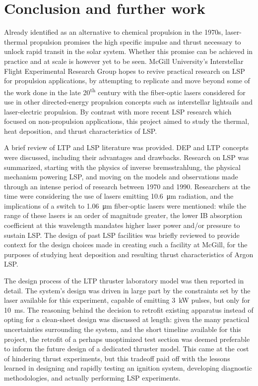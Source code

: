 \chapter{Conclusion and further work}
    Already identified as an alternative to chemical propulsion in the 1970s, laser-thermal propulsion promises the high specific impulse and thrust necessary to unlock rapid transit in the solar system. Whether this promise can be achieved in practice and at scale is however yet to be seen. McGill University's Interstellar Flight Experimental Research Group hopes to revive practical research on LSP for propulsion applications, by attempting to replicate and move beyond some of the work done in the late 20\textsuperscript{th} century with the fiber-optic lasers considered for use in other directed-energy propulsion concepts such as interstellar lightsails and laser-electric propulsion. By contrast with more recent LSP research which focused on non-propulsion applications, this project aimed to study the thermal, heat deposition, and thrust characteristics of LSP.

    A brief review of LTP and LSP literature was provided. DEP and LTP concepts were discussed, including their advantages and drawbacks. Research on LSP was summarized, starting with the physics of inverse bremsstrahlung, the physical mechanism powering LSP, and moving on the models and observations made through an intense period of research between 1970 and 1990. Researchers at the time were considering the use of  lasers emitting \qty{10.6}{\um} radiation, and the implications of a switch to \qty{1.06}{\um} fiber-optic lasers were mentioned: while the range of these lasers is an order of magnitude greater, the lower IB absorption coefficient at this wavelength mandates higher laser power and/or pressure to sustain LSP. The design of past LSP facilities was briefly reviewed to provide context for the design choices made in creating such a facility at McGill, for the purposes of studying heat deposition and resulting thrust characteristics of Argon LSP.

    The design process of the LTP thruster laboratory model was then reported in detail. The system's design was driven in large part by the constraints set by the laser available for this experiment, capable of emitting \qty{3}{kW} pulses, but only for \qty{10}{ms}. The reasoning behind the decision to retrofit existing apparatus instead of opting for a clean-sheet design was discussed at length: given the many practical uncertainties surrounding the system, and the short timeline available for this project, the retrofit of a perhaps unoptimized test section was deemed preferable to inform the future design of a dedicated thruster model. This came at the cost of hindering thrust experiments, but this tradeoff paid off with the lessons learned in designing and rapidly testing an ignition system, developing diagnostic methodologies, and actually performing LSP experiments.

